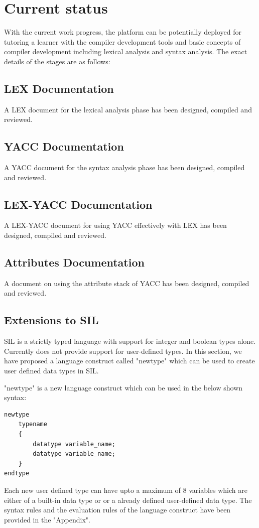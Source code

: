 \chapter{Current status}
With the current work progress, the platform can be potentially deployed for tutoring a learner with the compiler development tools and basic concepts of compiler development including lexical analysis and syntax analysis. The exact details of the stages are as follows: 
\section{LEX Documentation}
A LEX document for the lexical analysis phase has been designed, compiled and reviewed. 
\section{YACC Documentation}
A YACC document for the syntax analysis phase has been designed, compiled and reviewed.
\section{LEX-YACC Documentation}
A LEX-YACC document for using YACC effectively with LEX has been designed, compiled and reviewed.
\section{Attributes Documentation}
A document on using the attribute stack of YACC has been designed, compiled and reviewed.  
\section{Extensions to SIL}
SIL is a strictly typed language with support for integer and boolean types alone. Currently does not provide support for user-defined types. In this section, we have proposed a language construct called "newtype" which can be used to create user defined data types in SIL.

"newtype" is a new language construct which can be used in the below shown syntax:
\begin{verbatim}
newtype
	typename
	{
		datatype variable_name;
		datatype variable_name;
	}
endtype			
\end{verbatim}
Each new user defined type can have upto a maximum of 8 variables which are either of a built-in data type or or a already defined user-defined data type. The syntax rules and the evaluation rules of the language construct have been provided in the "Appendix". 

